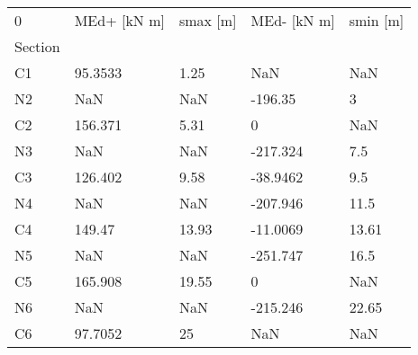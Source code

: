 \begin{tabular}{lllll}
\toprule
0 & MEd+ [kN m] & smax [m] & MEd- [kN m] & smin [m] \\
Section &             &          &             &          \\
\midrule
C1      &     95.3533 &     1.25 &         NaN &      NaN \\
N2      &         NaN &      NaN &     -196.35 &        3 \\
C2      &     156.371 &     5.31 &           0 &      NaN \\
N3      &         NaN &      NaN &    -217.324 &      7.5 \\
C3      &     126.402 &     9.58 &    -38.9462 &      9.5 \\
N4      &         NaN &      NaN &    -207.946 &     11.5 \\
C4      &      149.47 &    13.93 &    -11.0069 &    13.61 \\
N5      &         NaN &      NaN &    -251.747 &     16.5 \\
C5      &     165.908 &    19.55 &           0 &      NaN \\
N6      &         NaN &      NaN &    -215.246 &    22.65 \\
C6      &     97.7052 &       25 &         NaN &      NaN \\
\bottomrule
\end{tabular}
